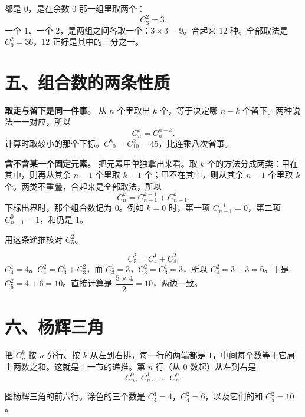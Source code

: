 \documentclass[11pt,a4paper,fontset=none]{ctexart}
\newcounter{worked}
\newcommand{\Worked}[1]{%
  \refstepcounter{worked}%
  \par\medskip
  \noindent{\sffamily\bfseries\color{TealDark}例~\theworked}\quad #1%
}
\begin{document}
都是 \(0\)，是在余数 \(0\) 那一组里取两个：
\[
  C_3^2=3.
\]
一个 \(1\)、一个 \(2\)，是两组之间各取一个：\(3\times 3=9\)。合起来 \(12\) 种。全部取法是 \(C_9^2=36\)，\(12\) 正好是其中的三分之一。

\section*{五、组合数的两条性质}

\textbf{取走与留下是同一件事。}
从 \(n\) 个里取出 \(k\) 个，等于决定哪 \(n-k\) 个留下。两种说法一一对应，所以
\[
  C_n^k=C_n^{n-k}.
\]
计算时取较小的那个下标。\(C_{10}^{8}=C_{10}^{2}=45\)，比连乘八次省事。

\textbf{含不含某一个固定元素。}
把元素甲单独拿出来看。取 \(k\) 个的方法分成两类：甲在其中，则再从其余 \(n-1\) 个里取 \(k-1\) 个；甲不在其中，则从其余 \(n-1\) 个里取 \(k\) 个。两类不重叠，合起来是全部取法，所以
\[
  C_n^k=C_{n-1}^{k-1}+C_{n-1}^{k}.
\]
下标出界时，那个组合数记为 \(0\)。例如 \(k=0\) 时，第一项 \(C_{n-1}^{-1}=0\)，第二项 \(C_{n-1}^{0}=1\)，和仍是 \(1\)。

\Worked{用这条递推核对 \(C_5^2\)。}

\[
  C_5^2=C_4^1+C_4^2.
\]
\(C_4^1=4\)。\(C_4^2=C_3^1+C_3^2\)，而 \(C_3^1=3\)，\(C_3^2=C_3^1=3\)，所以 \(C_4^2=3+3=6\)。于是 \(C_5^2=4+6=10\)。直接计算是 \(\dfrac{5\times 4}{2}=10\)，两边一致。

\section*{六、杨辉三角}

把 \(C_n^k\) 按 \(n\) 分行、按 \(k\) 从左到右排，每一行的两端都是 \(1\)，中间每个数等于它肩上两数之和。这就是上一节的递推。第 \(n\) 行（从 \(0\) 数起）从左到右是
\[
  C_n^0,\; C_n^1,\; \ldots,\; C_n^n.
\]

\begin{center}

\vspace{0.3em}
{\small 图\quad 杨辉三角的前六行。涂色的三个数是 \(C_4^1=4\)，\(C_4^2=6\)，以及它们的和 \(C_5^2=10\)。}
\end{center}
\end{document}
